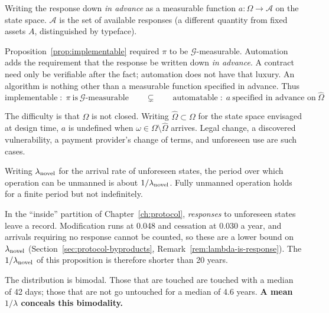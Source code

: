 \begin{definition}[Automation]
Writing the response down \emph{in advance} as a measurable function
$a:\Omega\to\mathcal{A}$ on the state space.
$\mathcal{A}$ is the set of available responses (a different quantity from fixed assets $A$,
distinguished by typeface).
\end{definition}

Proposition~\ref{prop:implementable} required $\pi$ to be $\mathcal{G}$-measurable.
Automation adds the requirement that the response be written down \emph{in advance}. A
contract need only be verifiable after the fact; automation does not have that luxury. An
algorithm is nothing other than a measurable function specified in advance. Thus
\begin{equation}
\text{implementable}\;:\;\pi\ \text{is}\ \mathcal{G}\text{-measurable}
\qquad\subsetneq\qquad
\text{automatable}\;:\;a\ \text{specified in advance on}\ \hat\Omega
\end{equation}

The difficulty is that $\Omega$ is not closed. Writing $\hat\Omega\subset\Omega$ for the
state space envisaged at design time, $a$ is undefined when
$\omega\in\Omega\setminus\hat\Omega$ arrives. Legal change, a discovered vulnerability, a
payment provider's change of terms, and unforeseen use are such cases.

\begin{proposition}
\label{prop:unmanned-period}
Writing $\lambda_{\rm novel}$ for the arrival rate of unforeseen states, the period over
which operation can be unmanned is about $1/\lambda_{\rm novel}$. Fully unmanned operation
holds for a finite period but not indefinitely.
\end{proposition}

\begin{remark}
\label{rem:lambda-upper}
In the ``inside'' partition of Chapter~\ref{ch:protocol}, \emph{responses} to unforeseen
states leave a record. Modification runs at 0.048 and cessation at 0.030 a year, and
arrivals requiring no response cannot be counted, so these are a lower bound on
$\lambda_{\rm novel}$ (Section~\ref{sec:protocol-byproducts},
Remark~\ref{rem:lambda-is-response}). The $1/\lambda_{\rm novel}$ of this proposition is
therefore shorter than 20 years.

The distribution is bimodal. Those that are touched are touched with a median of 42 days;
those that are not go untouched for a median of 4.6 years.
\textbf{A mean $1/\lambda$ conceals this bimodality.}
\end{remark}

